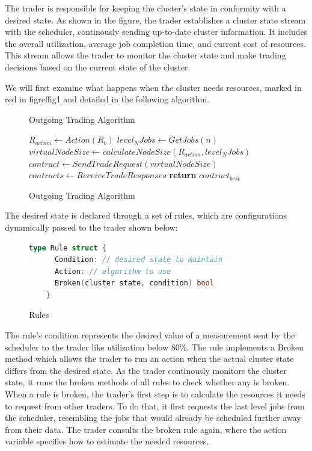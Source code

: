 The trader is responsible for keeping the cluster's state in conformity with a
desired state. As shown in the figure, the trader establishes a cluster state
stream with the scheduler, continously sending up-to-date cluster information.
It includes the overall utilization, average job completion time, and current
cost of resources. This stream allows the trader to monitor the cluster state
and make trading decisions based on the current state of the cluster.

We will first examine what happens when the cluster needs resources, marked in
red in figref{fig1} and detailed in the following algorithm.

\begin{figure}[H]
\begin{algorithm}[H]
\caption{Outgoing Trading Algorithm}
\begin{algorithmic}
   
    \State $R_{action} \gets Action(R_b)$
    \State $level_N Jobs \gets GetJobs(n)$ 
    \State $virtualNodeSize \gets calculateNodeSize(R_{action}, level_N Jobs)$
      \State $contract \gets SendTradeRequest(virtualNodeSize)$
    \EndFor
    \State $contracts \gets ReceiveTradeResponses$ 
    \State \textbf{return} $contract_{best}$
  \EndProcedure
\end{algorithmic}
\end{algorithm}
\caption{Outgoing Trading Algorithm}
\end{figure}

The desired state is declared through a set of rules, which are
configurations dynamically passed to the trader shown below:  

\begin{figure}[H]
  \begin{lstlisting}[language=go]
    type Rule struct {
      Condition: // desired state to maintain
      Action: // algorithm to use
      Broken(cluster state, condition) bool
    } 
  \end{lstlisting}
  \caption{Rules}
\end{figure}

The rule's condition represents the desired value of a measurement sent by the
scheduler to the trader like utilization below 80\%. The rule implements a
Broken method which allows the trader to run an action when the actual cluster
state differs from the desired state. As the trader continously monitors the
cluster state, it runs the broken methods of all rules to check whether any is
broken. When a rule is broken, the trader's first step is to calculate the
resources it needs to request from other traders. To do that, it first requests
the last level jobs from the scheduler, resembling the jobs that would already
be scheduled further away from their data. The trader consults the broken rule
again, where the action variable specifies how to estimate the needed
resources. 

